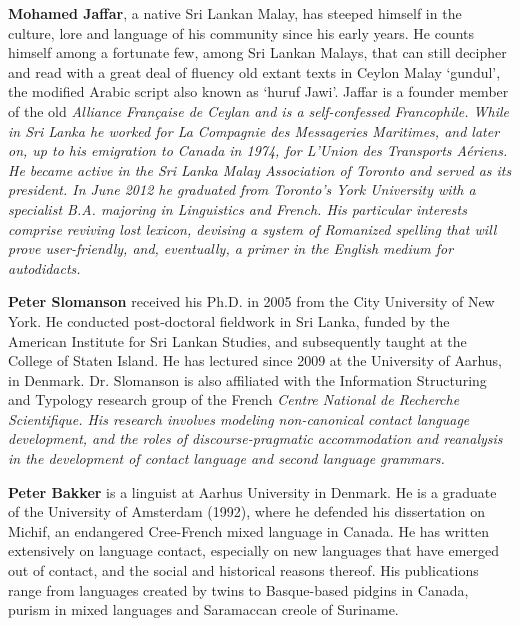\textbf{Mohamed Jaffar}, a native Sri Lankan Malay, has steeped himself in the culture, lore and language of his community since his early years.  He counts himself among a  fortunate few, among Sri Lankan Malays, that can still decipher and read with a great deal of fluency old extant texts in Ceylon Malay `gundul', the modified Arabic script also known as `huruf Jawi'.
Jaffar is a founder member of the old \em Alliance Française de Ceylan \em and is a self-confessed Francophile.  While in Sri Lanka he worked for \em La Compagnie des Messageries Maritimes\em, and later on, up to his emigration to Canada in 1974, for  \em L'Union des Transports Aériens\em.  He became active in the \em Sri Lanka Malay Association of Toronto \em and served as its president. In June 2012 he graduated from Toronto’s York University with a specialist B.A. majoring in Linguistics and French.
His particular interests comprise reviving lost lexicon, devising a system of Romanized spelling that will prove user-friendly, and, eventually, a primer in the English medium for autodidacts.

\textbf{Peter Slomanson} received his Ph.D. in 2005 from the City University of
New York. He conducted post-doctoral fieldwork in Sri Lanka, funded by
the American Institute for Sri Lankan Studies, and subsequently taught
at the College of Staten Island. He has lectured since 2009 at the
University of Aarhus, in Denmark. Dr. Slomanson is also affiliated
with the Information Structuring and Typology research group of the
French \em Centre National de Recherche Scientifique\em. His research
involves modeling non-canonical contact language development, and the
roles of discourse-pragmatic accommodation and reanalysis in the
development of contact language and second language grammars.

\textbf{Peter Bakker} is a linguist at Aarhus University in Denmark. He is a graduate of the University of Amsterdam (1992), where he defended his dissertation on Michif, an endangered Cree-French mixed language in Canada. He has written extensively on language contact, especially on new languages that have emerged out of contact, and the social and historical reasons thereof. His publications range from languages created by twins to Basque-based pidgins in Canada, purism in mixed languages and Saramaccan creole of
Suriname. 